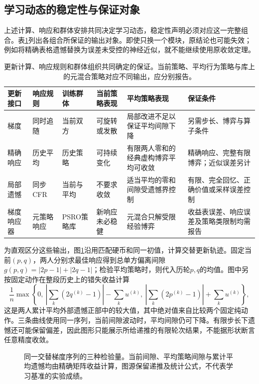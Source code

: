 \subsection{学习动态的稳定性与保证对象}
\label{sec:rl-multi-agent-stability}

上述计算、响应和群体安排共同决定学习动态，稳定性声明必须对应这一完整组合。表\ref{tab:rl-multi-agent-dynamics}列出各组合所保证的输出对象。即使只换一个模块，原结论也可能失效；例如将精确表格遗憾替换为误差未受控的神经近似，就不能继续使用原收敛定理。

\begin{table}[htbp]
 \centering
 \begin{tabularx}{\linewidth}{@{}l l l >{\raggedright\arraybackslash}X >{\raggedright\arraybackslash}X >{\raggedright\arraybackslash}X@{}}
 \toprule
 更新接口 & 响应规则 & 训练群体 & 当前策略表现 & 平均策略表现 & 保证条件\\
 \midrule
 梯度 & 同时追随 & 当前双方 & 可旋转或发散 & 局部改进不足以保证平均间隙下降 & 另需步长、博弈与算子条件\\
 精确响应 & 历史平均 & 历史策略 & 可持续变化 & 有限两人零和的经典虚构博弈平均可收敛 & 精确响应、完整有限博弈；近似误差另计\\
 局部遗憾 & 同步CFR & 当前与平均 & 不要求收敛 & 适当平均的零和间隙受遗憾界控制 & 有限、完全回忆、正确价值或采样误差控制\\
 梯度响应器 & 元策略响应 & PSRO策略库 & 新响应未必稳健 & 元混合只解受限经验博弈 & 收益表误差、响应误差及策略类限制均需报告\\
 \bottomrule
 \end{tabularx}
 \caption{更新计算、响应规则和群体组织共同确定的保证。当前策略、平均行为策略与库上的元混合策略对应不同输出，应分别报告。}
 \label{tab:rl-multi-agent-dynamics}
\end{table}

为直观区分这些输出，图\ref{fig:rl-multi-agent-stability}沿用匹配硬币和同一初值，计算交替更新轨迹。固定当前$(p,q)$，两人分别求最佳响应得到总单方偏离间隙
$g(p,q)=|2p-1|+|2q-1|$；检验平均策略时，则代入历轮$p,q$的均值。图中另按固定动作在整段历史上的错失收益计算
\[
 \frac1n\max\!\left\{0,\
 \left|\sum_k(2q^{(k)}-1)\right|-\sum_k u^{(k)},\
 \left|\sum_k(2p^{(k)}-1)\right|+\sum_k u^{(k)}\right\},
\]
这是两人累计平均外部遗憾正部中的较大值，其中绝对值来自比较两个固定纯动作。三条曲线使用同一序列，当前间隙波动时，平均间隙仍可下降。有限步长下遗憾还可能保留偏差，因此图形只能展示所给递推的有限轮次结果，不能据形状断言任意精度收敛。

\begin{figure}[htbp]
 \centering
 
 \caption{同一交替梯度序列的三种检验量。当前间隙、平均策略间隙与累计平均遗憾均由精确矩阵收益计算，图源保留递推及统计公式，不代表学习基准的实验成绩。}
 \label{fig:rl-multi-agent-stability}
\end{figure}

